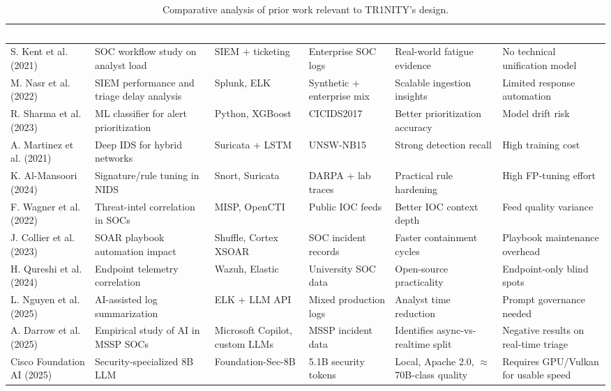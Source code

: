 \documentclass[11pt,a4paper]{article}
\begin{document}
\begin{table}[H]
\small
\setlength{\tabcolsep}{4pt}
\begin{tabularx}{\textwidth}{|>{}L{2.4cm}|L{2.5cm}|L{2.0cm}|L{2.0cm}|L{2.0cm}|L{2.0cm}|}
\hline
{}\textcolor{white}{\textbf{Author / Year}} & \textcolor{white}{\textbf{Method / Approach}} & \textcolor{white}{\textbf{Tools Used}} & \textcolor{white}{\textbf{Dataset}} & \textcolor{white}{\textbf{Pros}} & \textcolor{white}{\textbf{Cons}} \\
\hline
S. Kent et al. (2021) \cite{kent2021soc} & SOC workflow study on analyst load & SIEM + ticketing & Enterprise SOC logs & Real-world fatigue evidence & No technical unification model \\
\hline
M. Nasr et al. (2022) \cite{nasr2022siem} & SIEM performance and triage delay analysis & Splunk, ELK & Synthetic + enterprise mix & Scalable ingestion insights & Limited response automation \\
\hline
R. Sharma et al. (2023) \cite{sharma2023ml} & ML classifier for alert prioritization & Python, XGBoost & CICIDS2017 & Better prioritization accuracy & Model drift risk \\
\hline
A. Martinez et al. (2021) \cite{martinez2021dl} & Deep IDS for hybrid networks & Suricata + LSTM & UNSW-NB15 & Strong detection recall & High training cost \\
\hline
K. Al-Mansoori (2024) \cite{almansoori2024nids} & Signature/rule tuning in NIDS & Snort, Suricata & DARPA + lab traces & Practical rule hardening & High FP-tuning effort \\
\hline
F. Wagner et al. (2022) \cite{wagner2022ti} & Threat-intel correlation in SOCs & MISP, OpenCTI & Public IOC feeds & Better IOC context depth & Feed quality variance \\
\hline
J. Collier et al. (2023) \cite{collier2023soar} & SOAR playbook automation impact & Shuffle, Cortex XSOAR & SOC incident records & Faster containment cycles & Playbook maintenance overhead \\
\hline
H. Qureshi et al. (2024) \cite{qureshi2024wazuh} & Endpoint telemetry correlation & Wazuh, Elastic & University SOC data & Open-source practicality & Endpoint-only blind spots \\
\hline
L. Nguyen et al. (2025) \cite{nguyen2025llm} & AI-assisted log summarization & ELK + LLM API & Mixed production logs & Analyst time reduction & Prompt governance needed \\
\hline
A. Darrow et al. (2025) \cite{darrow2024aisoc} & Empirical study of AI in MSSP SOCs & Microsoft Copilot, custom LLMs & MSSP incident data & Identifies async-vs-realtime split & Negative results on real-time triage \\
\hline
Cisco Foundation AI (2025) \cite{cisco2025foundationsec} & Security-specialized 8B LLM & Foundation-Sec-8B & 5.1B security tokens & Local, Apache 2.0, $\approx$70B-class quality & Requires GPU/Vulkan for usable speed \\
\hline
\end{tabularx}
\caption{Comparative analysis of prior work relevant to TR1NITY's design.}
\end{table}
\end{document}
